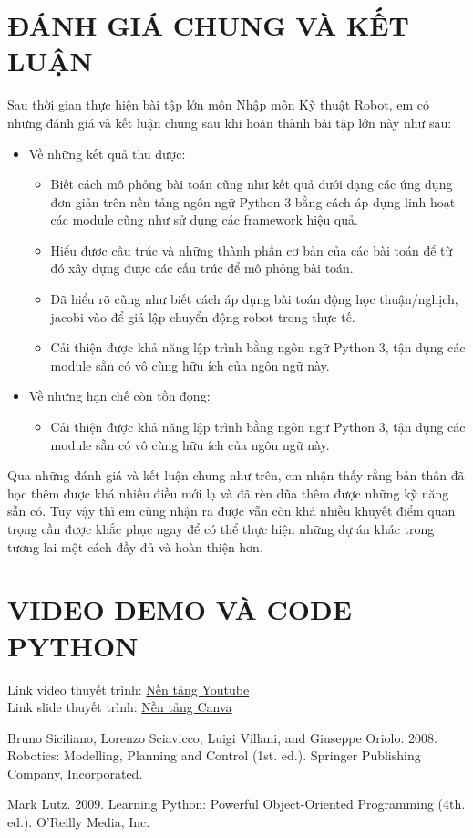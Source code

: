 \documentclass[a4paper]{article}
\begin{document}

\newpage
\tableofcontents
\newpage

\newpage

\newpage

\newpage

\newpage

\newpage

\section{ĐÁNH GIÁ CHUNG VÀ KẾT LUẬN}
Sau thời gian thực hiện bài tập lớn môn Nhập môn Kỹ thuật Robot, em có những đánh giá và kết luận chung sau khi hoàn thành bài tập lớn này như sau:
\begin{itemize}
    \item Về những kết quả thu được:
    \begin{itemize}
        \item Biết cách mô phỏng bài toán cũng như kết quả dưới dạng các ứng dụng đơn giản trên nền tảng ngôn ngữ Python 3 bằng cách áp dụng linh hoạt các module cũng như sử dụng các framework hiệu quả.
        \item Hiểu được cấu trúc và những thành phần cơ bản của các bài toán để từ đó xây dựng được các cấu trúc để mô phỏng bài toán. 
        \item Đã hiểu rõ cũng như biết cách áp dụng bài toán động học thuận/nghịch, jacobi vào để giả lập chuyển động robot trong thực tế.
        \item Cải thiện được khả năng lập trình bằng ngôn ngữ Python 3, tận dụng các module sẵn có vô cùng hữu ích của ngôn ngữ này.
    \end{itemize}
    \item Về những hạn chế còn tồn đọng:
    \begin{itemize}
        \item Cải thiện được khả năng lập trình bằng ngôn ngữ Python 3, tận dụng các module sẵn có vô cùng hữu ích của ngôn ngữ này.
    \end{itemize}
\end{itemize}
Qua những đánh giá và kết luận chung như trên, em nhận thấy rằng bản thân đã học thêm được khá nhiều điều mới lạ và đã rèn dũa thêm được những kỹ năng sẵn có. Tuy vậy thì em cũng nhận ra được vẫn còn khá nhiều khuyết điểm quan trọng cần được khắc phục ngay để có thể thực hiện những dự án khác trong tương lai một cách đầy đủ và hoàn thiện hơn. 
\section{VIDEO DEMO VÀ CODE PYTHON}
Link video thuyết trình: \href{}{Nền tảng Youtube}\\
Link slide thuyết trình: \href{}{Nền tảng Canva}
\begin{thebibliography}{99999}

Bruno Siciliano, Lorenzo Sciavicco, Luigi Villani, and Giuseppe Oriolo. 2008. Robotics: Modelling, Planning and Control (1st. ed.). Springer Publishing Company, Incorporated.

Mark Lutz. 2009. Learning Python: Powerful Object-Oriented Programming (4th. ed.). O'Reilly Media, Inc.

\end{thebibliography}
\end{document}
